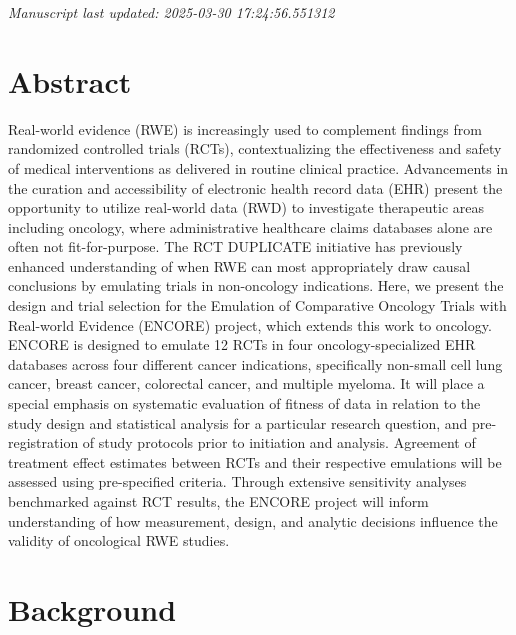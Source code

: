 \documentclass[
  letterpaper,
  DIV=11,
  numbers=noendperiod]{scrartcl}
\begin{document}
\emph{Manuscript last updated: 2025-03-30 17:24:56.551312}

\newpage{}

\section*{Abstract}\label{abstract}

Real-world evidence (RWE) is increasingly used to complement findings
from randomized controlled trials (RCTs), contextualizing the
effectiveness and safety of medical interventions as delivered in
routine clinical practice. Advancements in the curation and
accessibility of electronic health record data (EHR) present the
opportunity to utilize real-world data (RWD) to investigate therapeutic
areas including oncology, where administrative healthcare claims
databases alone are often not fit-for-purpose. The RCT DUPLICATE
initiative has previously enhanced understanding of when RWE can most
appropriately draw causal conclusions by emulating trials in
non-oncology indications. Here, we present the design and trial
selection for the Emulation of Comparative Oncology Trials with
Real-world Evidence (ENCORE) project, which extends this work to
oncology. ENCORE is designed to emulate 12 RCTs in four
oncology-specialized EHR databases across four different cancer
indications, specifically non-small cell lung cancer, breast cancer,
colorectal cancer, and multiple myeloma. It will place a special
emphasis on systematic evaluation of fitness of data in relation to the
study design and statistical analysis for a particular research
question, and pre-registration of study protocols prior to initiation
and analysis. Agreement of treatment effect estimates between RCTs and
their respective emulations will be assessed using pre-specified
criteria. Through extensive sensitivity analyses benchmarked against RCT
results, the ENCORE project will inform understanding of how
measurement, design, and analytic decisions influence the validity of
oncological RWE studies.

\newpage{}

\section{Background}\label{background}
\end{document}
